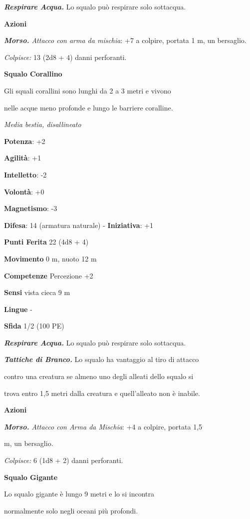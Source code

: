 \begin{multicols}{2}
\emph{\textbf{Respirare Acqua.}} Lo squalo può respirare solo sottacqua.

\smallskip\textbf{Azioni}

\emph{\textbf{Morso.} Attacco con arma da mischia}: +7 a colpire,
portata 1 m, un bersaglio.

\emph{Colpisce:} 13 (2d8 + 4) danni perforanti.

\textbf{Squalo Corallino}

Gli squali corallini sono lunghi da 2 a 3 metri e vivono

nelle acque meno profonde e lungo le barriere coralline.

\emph{Media bestia, disallineato}

\textbf{Potenza}: +2

\textbf{Agilità}: +1

\textbf{Intelletto}: -2

\textbf{Volontà}: +0

\textbf{Magnetismo}: -3

\textbf{Difesa}: 14 (armatura naturale) - \textbf{Iniziativa}: +1

\textbf{Punti Ferita} 22 (4d8 + 4)

\textbf{Movimento} 0 m, nuoto 12 m

\textbf{Competenze} Percezione +2

\textbf{Sensi} vista cieca 9 m

\textbf{Lingue} -

\textbf{Sfida} 1/2 (100 PE)\smallskip

\emph{\textbf{Respirare Acqua.}} Lo squalo può respirare solo sottacqua.

\emph{\textbf{Tattiche di Branco.}} Lo squalo ha vantaggio al tiro di
attacco

contro una creatura se almeno uno degli alleati dello squalo si

trova entro 1,5 metri dalla creatura e quell'alleato non è inabile.

\smallskip\textbf{Azioni}

\emph{\textbf{Morso.} Attacco con Arma da Mischia}: +4 a colpire,
portata 1,5

m, un bersaglio.

\emph{Colpisce:} 6 (1d8 + 2) danni perforanti.

\textbf{Squalo Gigante}

Lo squalo gigante è lungo 9 metri e lo si incontra

normalmente solo negli oceani più profondi.


\end{multicols}
